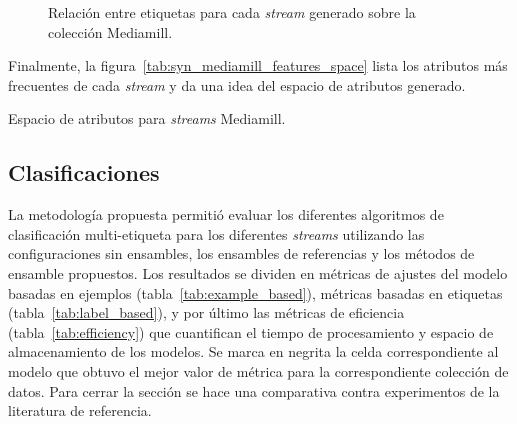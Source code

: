 \begin{figure}[htbp]
	\qquad
	\caption[Relación entre etiquetas para cada \textit{stream} generado sobre
		la colección Mediamill.]{Relación entre etiquetas para cada \textit{stream}
		generado sobre la colección Mediamill.}
	\label{fig:syn_mediamill_label_relationship}
\end{figure}
\vspace{1cm}

Finalmente, la figura~\ref{tab:syn_mediamill_features_space} lista los atributos más
frecuentes de cada \textit{stream} y da una idea del espacio de atributos
generado.

\begin{table}[htbp]
	\centering
	\begin{adjustbox}{max width=\textwidth}
		
	\end{adjustbox}
	\caption{Espacio de atributos para \textit{streams} Mediamill.}
	\label{tab:syn_mediamill_features_space}
\end{table}

\subsection{Clasificaciones}
\label{experimentos_clasificaciones}

La metodología propuesta permitió evaluar los diferentes algoritmos de
clasificación multi-etiqueta para los diferentes \textit{streams} utilizando las
configuraciones sin ensambles, los ensambles de referencias y los métodos de
ensamble propuestos. Los resultados se dividen en métricas de ajustes del modelo
basadas en ejemplos (tabla~\ref{tab:example_based}), métricas basadas en
etiquetas (tabla~\ref{tab:label_based}), y por último las métricas de eficiencia
(tabla~\ref{tab:efficiency}) que cuantifican el tiempo de procesamiento y
espacio de almacenamiento de los modelos. Se marca en negrita la celda
correspondiente al modelo que obtuvo el mejor valor de métrica para la
correspondiente colección de datos. Para cerrar la sección se hace una
comparativa contra experimentos de la literatura de referencia.

